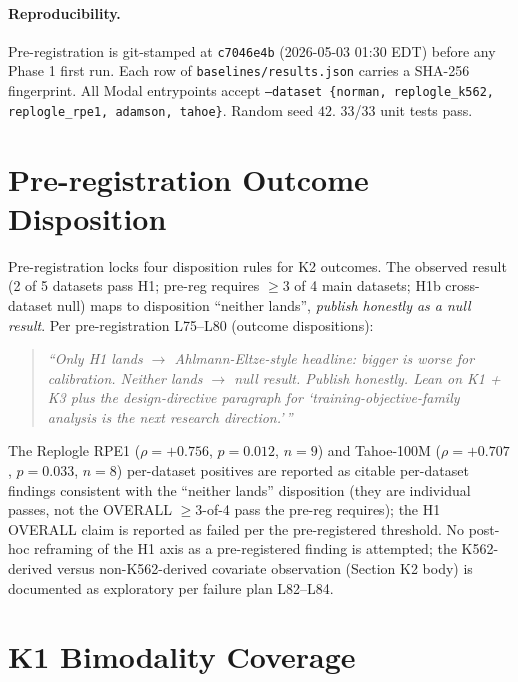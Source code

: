 \documentclass{article}
\begin{document}
\paragraph{Reproducibility.} Pre-registration is git-stamped at \texttt{c7046e4b} (2026-05-03 01:30 EDT) before any Phase 1 first run. Each row of \texttt{baselines/results.json} carries a SHA-256 fingerprint. All Modal entrypoints accept \texttt{--dataset \{norman, replogle\_k562, replogle\_rpe1, adamson, tahoe\}}. Random seed $42$. 33/33 unit tests pass.




\newpage
\appendix
\onecolumn

\section{Pre-registration Outcome Disposition}
\label{app:prereg}

Pre-registration locks four disposition rules for K2 outcomes. The observed result (2 of 5 datasets pass H1; pre-reg requires $\geq 3$ of 4 main datasets; H1b cross-dataset null) maps to disposition ``neither lands'', \emph{publish honestly as a null result}. Per pre-registration L75--L80 (outcome dispositions):

\begin{quote}
\textit{``Only H1 lands $\to$ Ahlmann-Eltze-style headline: bigger is worse for calibration. Neither lands $\to$ null result. Publish honestly. Lean on K1 + K3 plus the design-directive paragraph for `training-objective-family analysis is the next research direction.'\,''}
\end{quote}

The Replogle RPE1 ($\rho = +0.756$, $p = 0.012$, $n = 9$) and Tahoe-100M ($\rho = +0.707$, $p = 0.033$, $n = 8$) per-dataset positives are reported as citable per-dataset findings consistent with the ``neither lands'' disposition (they are individual passes, not the OVERALL $\geq 3$-of-4 pass the pre-reg requires); the H1 OVERALL claim is reported as failed per the pre-registered threshold. No post-hoc reframing of the H1 axis as a pre-registered finding is attempted; the K562-derived versus non-K562-derived covariate observation (Section K2 body) is documented as exploratory per failure plan L82--L84.

\section{K1 Bimodality Coverage}
\label{app:k1fig}
\end{document}
